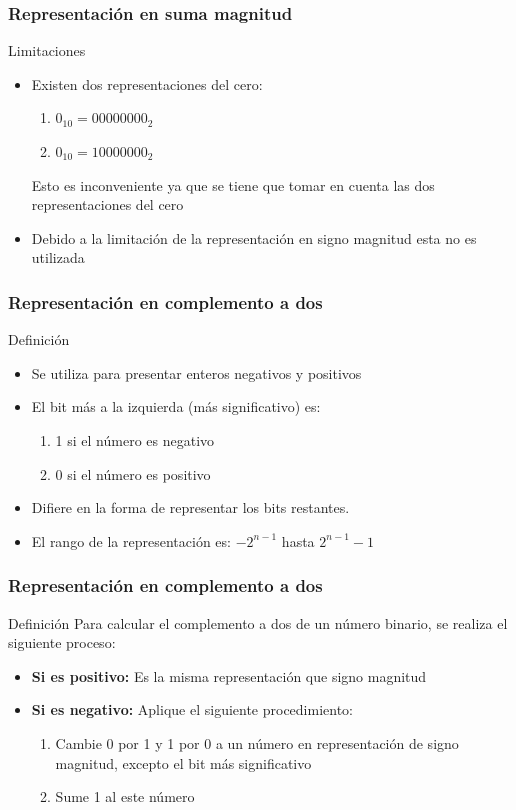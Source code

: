 \documentclass{beamer}
\begin{document}
\begin{frame}
	\frametitle{Representación en suma magnitud}
	\begin{block}{Limitaciones}
		\begin{itemize}
			\item Existen dos representaciones del cero:
			\begin{enumerate}
				\item $0_{10} = 00000000_{2}$
				\item $0_{10} = 10000000_{2}$
			\end{enumerate}
			Esto es inconveniente ya que se tiene que tomar en cuenta las dos representaciones del cero
			\item Debido a la limitación de la representación en signo magnitud esta no es utilizada
		\end{itemize}
	\end{block}	
\end{frame}


\begin{frame}
	\frametitle{Representación en complemento a dos}
	\begin{block}{Definición}
		\begin{itemize}
			\item Se utiliza para presentar enteros negativos y positivos
			\item El bit más a la izquierda (más significativo) es:
				\begin{enumerate}
					\item 1 si el número es negativo
					\item 0 si el número es positivo
				\end{enumerate}
			\item Difiere en la forma de representar los bits restantes.
			\item El rango de la representación es: $-2^{n-1}$ hasta $2^{n-1}-1$
		\end{itemize}
	\end{block}	
\end{frame}


\begin{frame}
	\frametitle{Representación en complemento a dos}
	\begin{block}{Definición}
		Para calcular el complemento a dos de un número binario, se realiza el siguiente proceso:
		\begin{itemize}
			\item \textbf{Si es positivo:} Es la misma representación que signo magnitud
			\item \textbf{Si es negativo:} Aplique el siguiente procedimiento:
			\begin{enumerate}
				\item Cambie 0 por 1 y 1 por 0 a un número en representación de signo magnitud, excepto el bit más significativo
				\item Sume 1 al este número
			\end{enumerate}

		\end{itemize}
	\end{block}	
\end{frame}
\end{document}
